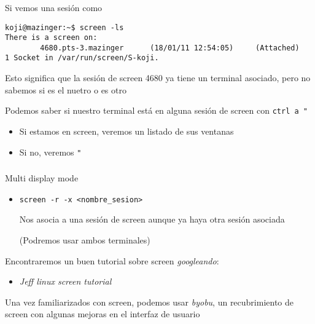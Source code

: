 \documentclass[ucs]{beamer}
\begin{document}
\begin{frame}[fragile]
\frametitle{}
Si vemos una sesión como 

  \begin{footnotesize}
  \begin{verbatim}
koji@mazinger:~$ screen -ls
There is a screen on:
        4680.pts-3.mazinger      (18/01/11 12:54:05)     (Attached)
1 Socket in /var/run/screen/S-koji.
  \end{verbatim}
  \end{footnotesize}
Esto significa que la sesión de screen 4680 ya tiene un terminal asociado, pero no sabemos si es el nuetro o es otro

Podemos saber si  nuestro terminal está en alguna sesión de screen con  \verb|ctrl a "|
\begin{itemize}
\item
Si estamos en screen,  veremos un listado de sus ventanas
\item
Si no, veremos \verb|"|

\end{itemize}

\end{frame}


\begin{frame}[fragile]
\frametitle{}
Multi display mode
\begin{itemize}
\item

  \begin{footnotesize}
  \begin{verbatim}
screen -r -x <nombre_sesion>   
  \end{verbatim}

  \end{footnotesize}
Nos asocia a una sesión de screen aunque ya haya otra sesión asociada

(Podremos usar ambos terminales)
\end{itemize}

Encontraremos un buen tutorial sobre screen \emph{googleando}:
\begin{itemize}
\item
\emph{Jeff linux screen tutorial}
\end{itemize}

Una vez familiarizados con screen, podemos usar \emph{byobu}, un
recubrimiento de screen con algunas mejoras en el interfaz de usuario

\end{frame}
\end{document}
